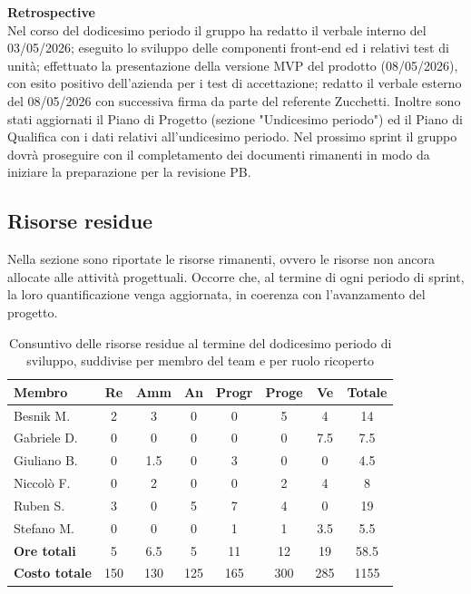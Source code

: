 \documentclass[a4paper,10pt]{article}
\begin{document}
\textbf{Retrospective} \\
Nel corso del dodicesimo periodo il gruppo ha redatto il verbale interno del 03/05/2026; eseguito lo sviluppo delle componenti front-end ed i relativi test di unità; effettuato la presentazione della versione MVP del prodotto (08/05/2026), con esito positivo dell'azienda per i test di accettazione; redatto il verbale esterno del 08/05/2026 con successiva firma da parte del referente Zucchetti. Inoltre sono stati aggiornati il Piano di Progetto (sezione "Undicesimo periodo") ed il Piano di Qualifica con i dati relativi all'undicesimo periodo.
Nel prossimo sprint il gruppo dovrà proseguire con il completamento dei documenti rimanenti in modo da iniziare la preparazione per la revisione PB.

\subsection{Risorse residue}
Nella sezione sono riportate le risorse rimanenti, ovvero le risorse non ancora allocate alle attività progettuali. Occorre che, al termine di ogni periodo di sprint, la loro quantificazione venga aggiornata, in coerenza con l'avanzamento del progetto.

\begin{table}[H]
  \centering
  \begin{tabular}{|l|c|c|c|c|c|c|c|}
    \hline
    \textbf{Membro} & \textbf{Re} & \textbf{Amm} & \textbf{An} & \textbf{Progr} & \textbf{Proge} & \textbf{Ve} & \textbf{Totale} \\
    \hline
    Besnik M.   & 2   & 3   & 0 & 0 & 5 & 4   & 14  \\
    Gabriele D. & 0   & 0   & 0 & 0 & 0 & 7.5 & 7.5 \\
    Giuliano B. & 0   & 1.5 & 0 & 3 & 0 & 0   & 4.5 \\
    Niccolò F.  & 0   & 2   & 0 & 0 & 2 & 4   & 8   \\
    Ruben S.    & 3   & 0   & 5 & 7 & 4 & 0   & 19  \\
    Stefano M.  & 0   & 0   & 0 & 1 & 1 & 3.5 & 5.5 \\
    \hline
    \textbf{Ore totali}   & 5    & 6.5  & 5    & 11   & 12   & 19  & 58.5 \\
    \hline
    \textbf{Costo totale} & 150  & 130  & 125  & 165  & 300  & 285 & 1155 \\
    \hline
  \end{tabular}
  \caption{Consuntivo delle risorse residue al termine del dodicesimo periodo di sviluppo, suddivise per membro del team e per ruolo ricoperto}
\end{table}
\end{document}
